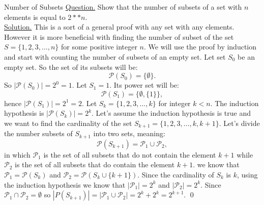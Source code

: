 \begin{example}{Number of Subsets}
	\underline{Question.} Show that the number of subsets of a set with $ n $ elements is equal to $ 2**n $. \\
	
	\underline{Solution.} This is a sort of a general proof with any set with any elements. However it is more beneficial with finding the number of subset of the set $ S = \{ 1,2,3, \hdots, n\} $ for some positive integer $ n $. We will use the proof by induction and start with counting the number of subsets of an empty set. Let set $ S_0 $ be an empty set. So the set of its subsets will be:
	\[ \mathcal{P}(S_0) = \{ \emptyset \}. \]
	So $ |\mathcal{P}(S_0)| = 2^0 = 1 $. Let $ S_1 = {1} $. Its power set will be:
	\[ \mathcal{P}(S_1) = \{ \emptyset, \{ 1 \} \}, \]
	hence $ |\mathcal{P}(S_1) | = 2^1 = 2 $. Let $ S_k = \{ 1,2,3,\hdots,k \} $ for integer $ k < n $. The induction hypothesis is $ |\mathcal{P}(S_k)| = 2^k $. Let's assume the induction hypothesis is true and we want to find the cardinality of the set $ S_{k+1} = \{1,2,3,\hdots, k,k+1\} $. Let's divide the number subsets of $ S_{k+1} $ into two sets, meaning:
	\[ \mathcal{P}(S_{k+1}) = \mathcal{P}_1 \cup \mathcal{P}_2, \]
	in which $ \mathcal{P}_1 $ is the set of all subsets that do not contain the element $ k+1 $ while $ \mathcal{P}_2 $ is the set of all subsets that do contain the element $ k+1 $. we know that $ \mathcal{P}_1 = \mathcal{P}(S_k) $ and $ \mathcal{P}_2 = \mathcal{P}(S_k \cup \{ k+1 \}) $. Since the cardinality of $ S_k $ is $ k $, using the induction hypothesis we know that $ |\mathcal{P}_1| = 2^k $ and $ |\mathcal{P}_2| = 2^{k} $. Since $ \mathcal{P}_1 \cap \mathcal{P}_2 = \emptyset $ so $ |P(S_{k+1})| = |\mathcal{P}_1 \cup \mathcal{P}_2| = 2^k + 2^k = 2^{k+1} $. \qed
\end{example}

